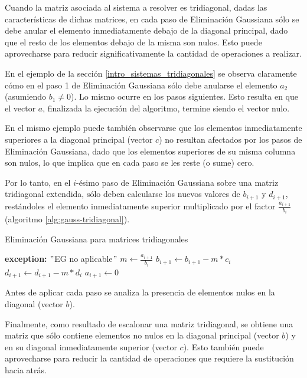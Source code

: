 Cuando la matriz asociada al sistema a resolver es tridiagonal, dadas las características de dichas matrices, en cada paso de Eliminación Gaussiana sólo se debe anular el elemento inmediatamente debajo de la diagonal principal, dado que el resto de los elementos debajo de la misma son nulos. Esto puede aprovecharse para reducir significativamente la cantidad de operaciones a realizar.

En el ejemplo de la sección \ref{intro_sistemas_tridiagonales} se observa claramente cómo en el paso 1 de Eliminación Gaussiana sólo debe anularse el elemento $a_{2}$ (asumiendo $b_{1} \neq 0$). Lo mismo ocurre en los pasos siguientes. Esto resulta en que el vector $a$, finalizada la ejecución del algoritmo, termine siendo el vector nulo.

En el mismo ejemplo puede también observarse que los elementos inmediatamente superiores a la diagonal principal (vector $c$) no resultan afectados por los pasos de Eliminación Gaussiana, dado que los elementos superiores de su misma columna son nulos, lo que implica que en cada paso se les reste (o sume) cero.

Por lo tanto, en el $i$-ésimo paso de Eliminación Gaussiana sobre una matriz tridiagonal extendida, sólo deben calcularse los nuevos valores de $b_{i+1}$ y $d_{i+1}$, restándoles el elemento inmediatamente superior multiplicado por el factor $\frac{a_{i+1}}{b_{i}}$ (algoritmo \ref{alg:gauss-tridiagonal}).

\begin{algorithm}[H]
\caption{Eliminación Gaussiana para matrices tridiagonales}\label{alg:gauss-tridiagonal}
\begin{algorithmic}
     
        \State \textbf{exception:} $"$EG no aplicable$"$ 
    \Else
        \State $m \gets \frac{a_{i+1}}{b_{i}}$
        \State $b_{i+1} \gets b_{i+1} - m * c_{i}$
        \State $d_{i+1} \gets d_{i+1} - m * d_{i}$
        \State $a_{i+1} \gets 0$
    \EndIf
\EndFor
\end{algorithmic}
\end{algorithm}

Antes de aplicar cada paso se analiza la presencia de elementos nulos en la diagonal (vector $b$).

Finalmente, como resultado de escalonar una matriz tridiagonal, se obtiene una matriz que sólo contiene elementos no nulos en la diagonal principal (vector $b$) y en su diagonal inmediatamente superior (vector $c$). Esto también puede aprovecharse para reducir la cantidad de operaciones que requiere la sustitución hacia atrás.

